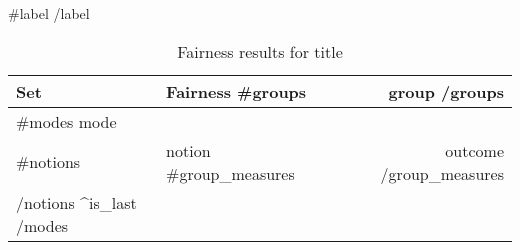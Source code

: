 \begin{table}[ht]
  \centering
  \caption{Fairness results for {{title}} }%
  {{#label}}
  \label{tab:{{label}}-fairness}
  {{/label}}
  \begin{tabular}{ll{}r{}}
    \toprule
    Set & Fairness {{#groups}}& {{group}} {{/groups}}\\
    \midrule
    {{#modes}}
      {{mode}}\\
      {{#notions}}
      & {{notion}}
      {{#group_measures}}
      & {{outcome}}
      {{/group_measures}}
      \\
      {{/notions}}
    {{^is_last}}\addlinespace{{/is_last}}
    {{/modes}}
    \bottomrule
  \end{tabular}
\end{table}
